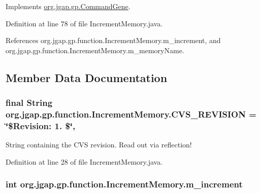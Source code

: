 Implements \hyperlink{classorg_1_1jgap_1_1gp_1_1_command_gene_a236141d99059da808afe7a9217e411c7}{org.\-jgap.\-gp.\-Command\-Gene}.



Definition at line 78 of file Increment\-Memory.\-java.



References org.\-jgap.\-gp.\-function.\-Increment\-Memory.\-m\-\_\-increment, and org.\-jgap.\-gp.\-function.\-Increment\-Memory.\-m\-\_\-memory\-Name.



\subsection{Member Data Documentation}
\hypertarget{classorg_1_1jgap_1_1gp_1_1function_1_1_increment_memory_a9820a169c9efd3c814bf8b4196006710}{
\subsubsection[{C\-V\-S\-\_\-\-R\-E\-V\-I\-S\-I\-O\-N}]{\setlength{\rightskip}{0pt plus 5cm}final String org.\-jgap.\-gp.\-function.\-Increment\-Memory.\-C\-V\-S\-\_\-\-R\-E\-V\-I\-S\-I\-O\-N = \char`\"{}\$Revision\-: 1. \$\char`\"{}\hspace{0.3cm}{\ttfamily [static]}, {\ttfamily [private]}}}\label{classorg_1_1jgap_1_1gp_1_1function_1_1_increment_memory_a9820a169c9efd3c814bf8b4196006710}
String containing the C\-V\-S revision. Read out via reflection! 

Definition at line 28 of file Increment\-Memory.\-java.

\hypertarget{classorg_1_1jgap_1_1gp_1_1function_1_1_increment_memory_a37ac2b55b700656b29453321a1798cdf}{
\subsubsection[{m\-\_\-increment}]{\setlength{\rightskip}{0pt plus 5cm}int org.\-jgap.\-gp.\-function.\-Increment\-Memory.\-m\-\_\-increment\hspace{0.3cm}{\ttfamily [private]}}}\label{classorg_1_1jgap_1_1gp_1_1function_1_1_increment_memory_a37ac2b55b700656b29453321a1798cdf}


